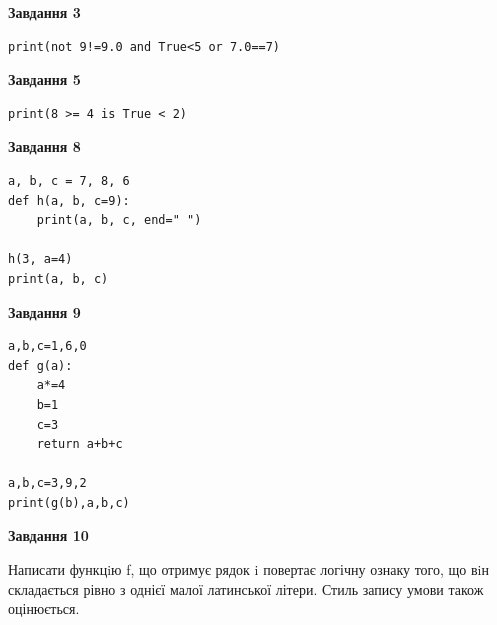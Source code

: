 \documentclass[12pt, ukrainian]{article}
\begin{document}
{\begin {large}
\begin{minipage}[t]{7.5cm}
\end{minipage}
\vline \hspace{6mm}
\begin{minipage}[t]{10.5cm}

\begin{center}
\textbf{Завдання 3}
\end{center}

\begin{verbatim}
print(not 9!=9.0 and True<5 or 7.0==7)
\end{verbatim}



\begin{center}
\textbf{Завдання 5}
\end{center}

\begin{verbatim}
print(8 >= 4 is True < 2)
\end{verbatim}



\begin{center}
\textbf{Завдання 8}
\end{center}

\begin{verbatim}
a, b, c = 7, 8, 6
def h(a, b, c=9):
    print(a, b, c, end=" ")

h(3, a=4)
print(a, b, c)
\end{verbatim}



\begin{center}
\textbf{Завдання 9}
\end{center}

\begin{verbatim}
a,b,c=1,6,0
def g(a):
    a*=4
    b=1
    c=3
    return a+b+c

a,b,c=3,9,2
print(g(b),a,b,c)
\end{verbatim}



\begin{center}
\textbf{Завдання 10}
\end{center}

Написати функцiю f, що отримує рядок i повертає логічну ознаку того, що вiн складається рівно з однієї малої латинської літери. Стиль запису умови також оцінюється.\par

\end{minipage}

\end {large}}
\newpage
\end{document}
